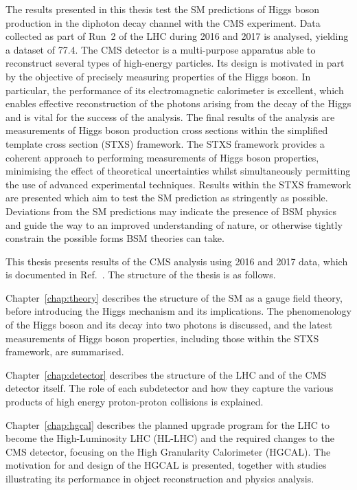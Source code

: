 The results presented in this thesis test the SM predictions of Higgs boson production
in the diphoton decay channel with the CMS experiment.
Data collected as part of Run~2 of the LHC during 2016 and 2017 is analysed, 
yielding a dataset of \SI{77.4}{\fbinv}.
The CMS detector is a multi-purpose apparatus able to reconstruct several types of high-energy particles.
Its design is motivated in part by the objective of precisely measuring properties of the Higgs boson.
In particular, the performance of its electromagnetic calorimeter is excellent, 
which enables effective reconstruction of the photons arising from the decay of the Higgs 
and is vital for the success of the \Hgg analysis.
The final results of the analysis are measurements of Higgs boson production cross sections
within the simplified template cross section (STXS) framework.
The STXS framework provides a coherent approach to performing measurements of Higgs boson properties, 
minimising the effect of theoretical uncertainties 
whilst simultaneously permitting the use of advanced experimental techniques.
Results within the STXS framework are presented
which aim to test the SM prediction as stringently as possible.
Deviations from the SM predictions may indicate the presence of BSM physics 
and guide the way to an improved understanding of nature, 
or otherwise tightly constrain the possible forms BSM theories can take.

This thesis presents results of the CMS \Hgg analysis using 2016 and 2017 data, 
which is documented in Ref.~\cite{HIG-18-029}.
The structure of the thesis is as follows.

Chapter~\ref{chap:theory} describes the structure of the SM as a gauge field theory, 
before introducing the Higgs mechanism and its implications.
The phenomenology of the Higgs boson and its decay into two photons is discussed, 
and the latest measurements of Higgs boson properties, including those within the STXS framework, 
are summarised.

Chapter~\ref{chap:detector} describes the structure of the LHC and of the CMS detector itself.
The role of each subdetector and how they capture the various products 
of high energy proton-proton collisions is explained.

Chapter~\ref{chap:hgcal} describes the planned upgrade program for the LHC to become the High-Luminosity LHC (HL-LHC) 
and the required changes to the CMS detector, focusing on the High Granularity Calorimeter (HGCAL).
The motivation for and design of the HGCAL is presented, 
together with studies illustrating its performance in object reconstruction and physics analysis.

